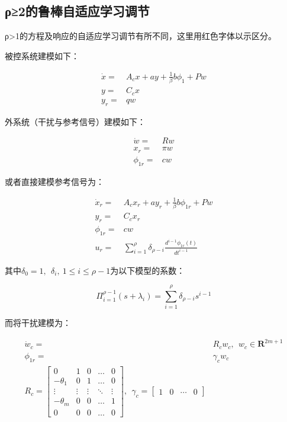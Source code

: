 \documentclass[
  12pt,
  a4paper
]{article}
\begin{document}
\subsection{ρ≥2的鲁棒自适应学习调节}\label{ux3c12ux7684ux9c81ux68d2ux81eaux9002ux5e94ux5b66ux4e60ux8c03ux8282}

ρ\textgreater1的方程及响应的自适应学习调节有所不同，这里用红色字体以示区分。

被控系统建模如下：

\[\begin{aligned}
\dot{x} = & A_{c}x + ay + \frac{1}{\beta}b\phi_{1} + Pw \\
y = & C_{c}x \\
y_{r} = & qw
\end{aligned}\]

外系统（干扰与参考信号）建模如下：

\[\begin{aligned}
\dot{w} = & Rw \\
x_{r} = & \pi w \\
\phi_{1r} = & cw
\end{aligned}\]

或者直接建模参考信号为：

\[\begin{aligned}
{\dot{x}}_{r} = & A_{c}x_{r} + ay_{r} + \frac{1}{\beta}b\phi_{1r} + Pw \\
y_{r} = & C_{c}x_{r} \\
\phi_{1r} = & cw \\
u_{r} = & \sum_{i = 1}^{\rho}{\delta_{\rho - i}\frac{d^{i - 1}\phi_{1r}(t)}{dt^{i - 1}}}
\end{aligned}\]

其中\(\delta_{0} = 1,\ \ \delta_{i},\ 1 \leq i \leq \rho - 1\)为以下模型的系数：

\[\Pi_{i = 1}^{\rho - 1}\left( s + \lambda_{i} \right) = \sum_{i = 1}^{\rho}{\delta_{\rho - i}s^{i - 1}}\]

而将干扰建模为：

\[\begin{aligned}
{\dot{w}}_{c} = & R_{c}w_{c},\ \ w_{c} \in \mathbf{R}^{2m + 1} \\
\phi_{1r} = & \gamma_{c}w_{c} \\
R_{c} = \begin{bmatrix}
0 & 1 & 0 & \ldots & 0 \\
 - \theta_{1} & 0 & 1 & \ldots & 0 \\
 \vdots & \vdots & \vdots & \ddots & \vdots \\
 - \theta_{m} & 0 & 0 & \ldots & 1 \\
0 & 0 & 0 & \ldots & 0
\end{bmatrix},\ \ \gamma_{c} = \begin{bmatrix}
1 & 0 & \cdots & 0
\end{bmatrix}
\end{aligned}\]
\end{document}

